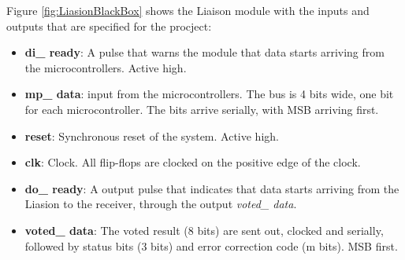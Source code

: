 \documentclass[a4paper]{IEEEtran}
\begin{document}
Figure \ref{fig:LiasionBlackBox} shows the Liaison module with the inputs and outputs that are specified for the procject:
\begin{itemize}
    \item \textbf{di\_ ready}: A pulse that warns the module that data starts arriving from the microcontrollers. Active high.
    \item \textbf{mp\_ data}: input from the microcontrollers. The bus is 4 bits wide, one bit for each microcontroller. The bits arrive serially, with MSB arriving first.
    \item \textbf{reset}: Synchronous reset of the system. Active high.
    \item \textbf{clk}: Clock. All flip-flops are clocked on the positive edge of the clock.
    \item \textbf{do\_ ready}: A output pulse that indicates that data starts arriving from the Liasion to the receiver, through the output \textit{voted\_ data}.
    \item  \textbf{voted\_ data}: The voted result (8 bits) are sent out, clocked and serially, followed by status bits (3 bits) and error correction code (m bits). MSB first.
\end{itemize}
\end{document}
